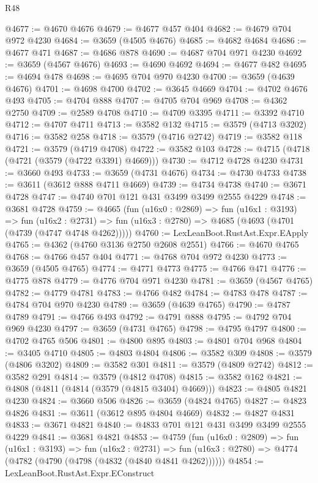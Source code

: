 \begin{lexlean}{R48}
\begin{coremodule}
@4677 := @4670 @4676
@4679 := @4677 @457 @404
@4682 := @4679 @704 @972 @4230
@4684 := @3659 (@4505 @4676)
@4685 := @4682 @4684
@4686 := @4677 @471
@4687 := @4686 @878
@4690 := @4687 @704 @971 @4230
@4692 := @3659 (@4567 @4676)
@4693 := @4690 @4692
@4694 := @4677 @482
@4695 := @4694 @478
@4698 := @4695 @704 @970 @4230
@4700 := @3659 (@4639 @4676)
@4701 := @4698 @4700
@4702 := @3645 @4669
@4704 := @4702 @4676 @493
@4705 := @4704 @888
@4707 := @4705 @704 @969
@4708 := @4362 @2750
@4709 := @2589 @4708
@4710 := @4709 @3395
@4711 := @3392 @4710
@4712 := @4707 @4711
@4713 := @3582 @132
@4715 := @3579 (@4713 @3202)
@4716 := @3582 @258
@4718 := @3579 (@4716 @2742)
@4719 := @3582 @118
@4721 := @3579 (@4719 @4708)
@4722 := @3582 @103
@4728 := @4715 (@4718 (@4721 (@3579 (@4722 @3391) @4669)))
@4730 := @4712 @4728 @4230
@4731 := @3660 @493
@4733 := @3659 (@4731 @4676)
@4734 := @4730 @4733
@4738 := @3611 (@3612 @888 @4711 @4669)
@4739 := @4734 @4738
@4740 := @3671 @4728
@4747 := @4740 @701 @121 @431 @3499 @3499 @2555 @4229
@4748 := @3681 @4728
@4759 := @4665
    (fun (u16x0 : @2869) =>
    fun (u16x1 : @3193) =>
    fun (u16x2 : @2731) => fun (u16x3 : @2780) => @4685 (@4693 (@4701 (@4739 (@4747 @4748 @4262)))))
@4760 := LexLeanBoot.RustAst.Expr.EApply
@4765 := @4362 (@4760 @3136 @2750 @2608 @2551)
@4766 := @4670 @4765
@4768 := @4766 @457 @404
@4771 := @4768 @704 @972 @4230
@4773 := @3659 (@4505 @4765)
@4774 := @4771 @4773
@4775 := @4766 @471
@4776 := @4775 @878
@4779 := @4776 @704 @971 @4230
@4781 := @3659 (@4567 @4765)
@4782 := @4779 @4781
@4783 := @4766 @482
@4784 := @4783 @478
@4787 := @4784 @704 @970 @4230
@4789 := @3659 (@4639 @4765)
@4790 := @4787 @4789
@4791 := @4766 @493
@4792 := @4791 @888
@4795 := @4792 @704 @969 @4230
@4797 := @3659 (@4731 @4765)
@4798 := @4795 @4797
@4800 := @4702 @4765 @506
@4801 := @4800 @895
@4803 := @4801 @704 @968
@4804 := @3405 @4710
@4805 := @4803 @4804
@4806 := @3582 @309
@4808 := @3579 (@4806 @3202)
@4809 := @3582 @301
@4811 := @3579 (@4809 @2742)
@4812 := @3582 @291
@4814 := @3579 (@4812 @4708)
@4815 := @3582 @162
@4821 := @4808 (@4811 (@4814 (@3579 (@4815 @3404) @4669)))
@4823 := @4805 @4821 @4230
@4824 := @3660 @506
@4826 := @3659 (@4824 @4765)
@4827 := @4823 @4826
@4831 := @3611 (@3612 @895 @4804 @4669)
@4832 := @4827 @4831
@4833 := @3671 @4821
@4840 := @4833 @701 @121 @431 @3499 @3499 @2555 @4229
@4841 := @3681 @4821
@4853 := @4759
    (fun (u16x0 : @2809) =>
    fun (u16x1 : @3193) =>
    fun (u16x2 : @2731) =>
    fun (u16x3 : @2780) => @4774 (@4782 (@4790 (@4798 (@4832 (@4840 @4841 @4262))))))
@4854 := LexLeanBoot.RustAst.Expr.EConstruct

\end{coremodule}
\end{lexlean}
